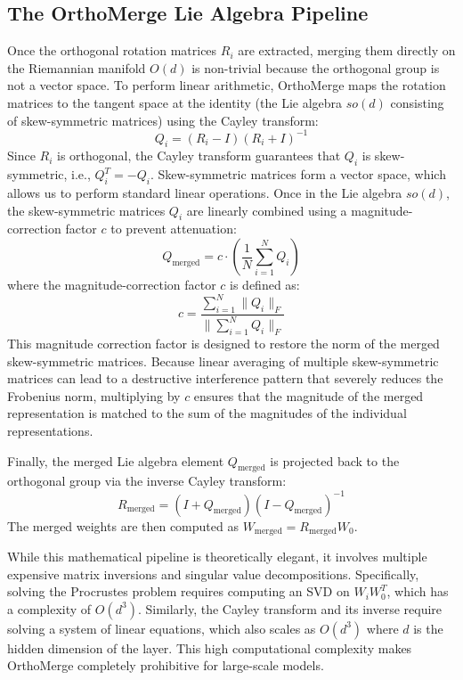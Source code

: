 \documentclass{article}
\begin{document}
\subsection{The OrthoMerge Lie Algebra Pipeline}
Once the orthogonal rotation matrices $R_i$ are extracted, merging them directly on the Riemannian manifold $O(d)$ is non-trivial because the orthogonal group is not a vector space. To perform linear arithmetic, OrthoMerge maps the rotation matrices to the tangent space at the identity (the Lie algebra $so(d)$ consisting of skew-symmetric matrices) using the Cayley transform:
\begin{equation}
    Q_i = (R_i - I)(R_i + I)^{-1}
\end{equation}
Since $R_i$ is orthogonal, the Cayley transform guarantees that $Q_i$ is skew-symmetric, i.e., $Q_i^T = -Q_i$. Skew-symmetric matrices form a vector space, which allows us to perform standard linear operations. Once in the Lie algebra $so(d)$, the skew-symmetric matrices $Q_i$ are linearly combined using a magnitude-correction factor $c$ to prevent attenuation:
\begin{equation}
    Q_{\text{merged}} = c \cdot \left(\frac{1}{N} \sum_{i=1}^N Q_i\right)
\end{equation}
where the magnitude-correction factor $c$ is defined as:
\begin{equation}
    c = \frac{\sum_{i=1}^N \|Q_i\|_F}{\|\sum_{i=1}^N Q_i\|_F}
\end{equation}
This magnitude correction factor is designed to restore the norm of the merged skew-symmetric matrices. Because linear averaging of multiple skew-symmetric matrices can lead to a destructive interference pattern that severely reduces the Frobenius norm, multiplying by $c$ ensures that the magnitude of the merged representation is matched to the sum of the magnitudes of the individual representations.

Finally, the merged Lie algebra element $Q_{\text{merged}}$ is projected back to the orthogonal group via the inverse Cayley transform:
\begin{equation}
    R_{\text{merged}} = (I + Q_{\text{merged}})(I - Q_{\text{merged}})^{-1}
\end{equation}
The merged weights are then computed as $W_{\text{merged}} = R_{\text{merged}} W_0$.

While this mathematical pipeline is theoretically elegant, it involves multiple expensive matrix inversions and singular value decompositions. Specifically, solving the Procrustes problem requires computing an SVD on $W_i W_0^T$, which has a complexity of $O(d^3)$. Similarly, the Cayley transform and its inverse require solving a system of linear equations, which also scales as $O(d^3)$ where $d$ is the hidden dimension of the layer. This high computational complexity makes OrthoMerge completely prohibitive for large-scale models.
\end{document}
